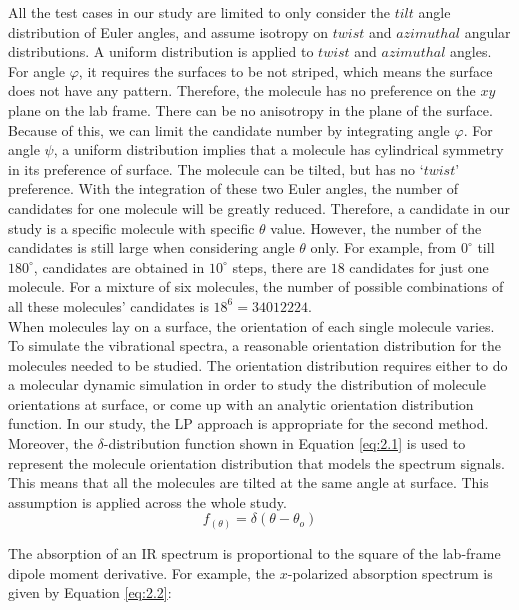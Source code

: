 All the test cases in our study are limited to only consider the $tilt$ angle distribution of Euler angles, and assume isotropy on $twist$ and $azimuthal$ angular distributions. A uniform distribution is applied to $twist$ and $azimuthal$ angles. For angle $\varphi$, it requires the surfaces to be not striped, which means the surface does not have any pattern. Therefore, the molecule has no preference on the $xy$ plane on the lab frame. There can be no anisotropy in the plane of the surface. Because of this, we can limit the candidate number by integrating angle $\varphi$. For angle $\psi$, a uniform distribution implies that a molecule has cylindrical symmetry in its preference of surface. The molecule can be tilted, but has no `$twist$' preference. With the integration of these two Euler angles, the number of candidates for one molecule will be greatly reduced. Therefore, a candidate in our study is a specific molecule with specific $\theta$ value. However, the number of the candidates is still large when considering angle $\theta$ only. For example, from $0^{\circ}$ till $180^{\circ}$, candidates are obtained in $10^{\circ}$ steps, there are $18$ candidates for just one molecule. For a mixture of six molecules, the number of possible combinations of all these molecules' candidates is $18^{6} = 34012224$. \\

When molecules lay on a surface, the orientation of each single molecule varies. To simulate the vibrational spectra, a reasonable orientation distribution for the molecules needed to be studied. The orientation distribution requires either to do a molecular dynamic simulation in order to study the distribution of molecule orientations at surface, or come up with an analytic orientation distribution function. In our study, the LP approach is appropriate for the second method. Moreover, the $\delta$-distribution function shown in Equation \ref{eq:2.1} is used to represent the molecule orientation distribution that models the spectrum signals. This means that all the molecules are tilted at the same angle at surface. This assumption is applied across the whole study. \\

\begin{equation} \label{eq:2.1}
f_{(\theta)} = \delta(\theta - \theta_{o})
\end{equation} 

The absorption of an IR spectrum is proportional to the square of the lab-frame dipole moment derivative. For example, the $x$-polarized absorption spectrum is given by Equation \ref{eq:2.2}: \\

